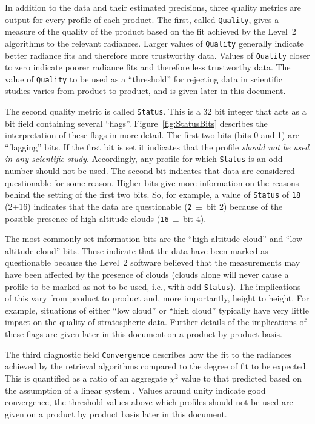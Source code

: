 \documentclass[11pt,draft]{report}
\begin{document}
 
In addition to the data and their estimated precisions, three quality
metrics are output for every profile of each product.  The first, called
\texttt{Quality}, gives a measure of the quality of the product based on
the fit achieved by the Level~2 algorithms to the relevant radiances.
Larger values of \texttt{Quality} generally indicate better radiance
fits and therefore more trustworthy data. Values of \texttt{Quality}
closer to zero indicate poorer radiance fits and therefore less
trustworthy data.  The value of \texttt{Quality} to be used as a
``threshold'' for rejecting data in scientific studies varies from
product to product, and is given later in this document.

The second quality metric is called \texttt{Status}.  This is a 32 bit
integer that acts as a bit field containing several ``flags''.
Figure~\ref{fig:StatusBits} describes the interpretation of these flags
in more detail.  The first two bits (bits 0 and 1) are ``flagging''
bits.  If the first bit is set it indicates that the profile
\emph{should not be used in any scientific study}.  Accordingly, any
profile for which \texttt{Status} is an odd number should not be used.
The second bit indicates that data are considered questionable for some
reason.  Higher bits give more information on the reasons behind the
setting of the first two bits.  So, for example, a value of
\texttt{Status} of \texttt{18} (2+16) indicates that the data are
questionable (\texttt{2}\,$\equiv$\,bit 2) because of the possible
presence of high altitude clouds (\texttt{16}\,$\equiv$\,bit 4).

The most commonly set information bits are the ``high altitude cloud''
and ``low altitude cloud'' bits.  These indicate that the data have been
marked as questionable because the Level~2 software believed that the
measurements may have been affected by the presence of clouds (clouds
alone will never cause a profile to be marked as not to be used, i.e.,
with odd \texttt{Status}).  The implications of this vary from product
to product and, more importantly, height to height.  For example,
situations of either ``low cloud'' or ``high cloud'' typically have very
little impact on the quality of stratospheric data.  Further details of
the implications of these flags are given later in this document on a
product by product basis.

The third diagnostic field \texttt{Convergence} describes how the fit to
the radiances achieved by the retrieval algorithms compared to the
degree of fit to be expected.  This is quantified as a ratio of an
aggregate $\chi^2$ value to that predicted based on the assumption of a
linear system \citep{LiveseyEtal06}.  Values around unity indicate good
convergence, the threshold values above which profiles should not be used
are given on a product by product basis later in this document.
\end{document}
